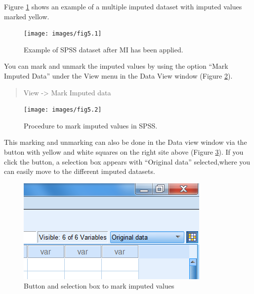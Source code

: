 \documentclass[
]{book}
\begin{document}
Figure \ref{fig:fig5-1} shows an example of a multiple imputed dataset with imputed values marked yellow.

\begin{figure}

{\centering \texttt{[image: images/fig5.1]} 

}

\caption{Example of SPSS dataset after MI has been applied.}\label{fig:fig5-1}
\end{figure}

You can mark and unmark the imputed values by using the option ``Mark Imputed Data'' under the View menu in the Data View window (Figure \ref{fig:fig5-2}).

\begin{quote}
View -\textgreater{} Mark Imputed data
\end{quote}

\begin{figure}

{\centering \texttt{[image: images/fig5.2]} 

}

\caption{Procedure to mark imputed values in SPSS.}\label{fig:fig5-2}
\end{figure}

This marking and unmarking can also be done in the Data view window via the button with yellow and white squares on the right site above (Figure \ref{fig:fig4-11}). If you click the button, a selection box appears with ``Original data'' selected,where you can easily move to the different imputed datasets.

\begin{figure}

{\centering \includegraphics[width=0.9\linewidth]{images/fig4.11} 

}

\caption{Button and selection box to mark imputed values}\label{fig:fig4-11}
\end{figure}
\end{document}
